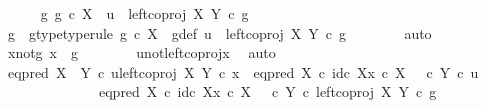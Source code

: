 \begin{isabellebody}
\ \ \ \ \isamarkupfalse%
\ {\isachardoublequoteopen}{\isasymexists}g{\isachardot}{\kern0pt}\ g\ {\isasymin}\isactrlsub c\ X\ {\isasymand}\ u\ {\isacharequal}{\kern0pt}\ left{\isacharunderscore}{\kern0pt}coproj\ X\ Y\ {\isasymcirc}\isactrlsub c\ g{\isachardoublequoteclose}\isanewline
\ \ \ \ \isamarkupfalse%
\ \isamarkupfalse%
\ g\ \ g{\isacharunderscore}{\kern0pt}type{\isacharbrackleft}{\kern0pt}type{\isacharunderscore}{\kern0pt}rule{\isacharbrackright}{\kern0pt}{\isacharcolon}{\kern0pt}\ {\isachardoublequoteopen}g\ {\isasymin}\isactrlsub c\ X{\isachardoublequoteclose}\ \ g{\isacharunderscore}{\kern0pt}def{\isacharcolon}{\kern0pt}\ {\isachardoublequoteopen}u\ {\isacharequal}{\kern0pt}\ left{\isacharunderscore}{\kern0pt}coproj\ X\ Y\ {\isasymcirc}\isactrlsub c\ g{\isachardoublequoteclose}\isanewline
\ \ \ \ \ \ \isamarkupfalse%
\ auto\isanewline
\ \ \ \ \isamarkupfalse%
\ \isamarkupfalse%
\ x{\isacharunderscore}{\kern0pt}not{\isacharunderscore}{\kern0pt}g{\isacharcolon}{\kern0pt}\ {\isachardoublequoteopen}x\ {\isasymnoteq}\ g{\isachardoublequoteclose}\isanewline
\ \ \ \ \ \ \isamarkupfalse%
\ u{\isacharunderscore}{\kern0pt}not{\isacharunderscore}{\kern0pt}left{\isacharunderscore}{\kern0pt}coproj{\isacharunderscore}{\kern0pt}x\ \isamarkupfalse%
\ auto\isanewline
\ \ \ \ \isamarkupfalse%
\ {\isachardoublequoteopen}eq{\isacharunderscore}{\kern0pt}pred\ {\isacharparenleft}{\kern0pt}X\ {\isasymCoprod}\ Y{\isacharparenright}{\kern0pt}\ {\isasymcirc}\isactrlsub c\ {\isasymlangle}u{\isacharcomma}{\kern0pt}left{\isacharunderscore}{\kern0pt}coproj\ X\ Y\ {\isasymcirc}\isactrlsub c\ x{\isasymrangle}\ {\isacharequal}{\kern0pt}\ {\isacharparenleft}{\kern0pt}eq{\isacharunderscore}{\kern0pt}pred\ X\ {\isasymcirc}\isactrlsub c\ {\isasymlangle}id\isactrlsub c\ X{\isacharcomma}{\kern0pt}x\ {\isasymcirc}\isactrlsub c\ {\isasymbeta}\isactrlbsub X\isactrlesub {\isasymrangle}{\isacharparenright}{\kern0pt}\ {\isasymamalg}\ {\isacharparenleft}{\kern0pt}{\isasymf}\ {\isasymcirc}\isactrlsub c\ {\isasymbeta}\isactrlbsub Y\isactrlesub {\isacharparenright}{\kern0pt}\ {\isasymcirc}\isactrlsub c\ u{\isachardoublequoteclose}\isanewline
\ \ \ \ \isamarkupfalse%
\ {\isacharminus}{\kern0pt}\isanewline
\ \ \ \ \ \ \isamarkupfalse%
\ {\isachardoublequoteopen}{\isacharparenleft}{\kern0pt}eq{\isacharunderscore}{\kern0pt}pred\ X\ {\isasymcirc}\isactrlsub c\ {\isasymlangle}id\isactrlsub c\ X{\isacharcomma}{\kern0pt}x\ {\isasymcirc}\isactrlsub c\ {\isasymbeta}\isactrlbsub X\isactrlesub {\isasymrangle}{\isacharparenright}{\kern0pt}\ {\isasymamalg}\ {\isacharparenleft}{\kern0pt}{\isasymf}\ {\isasymcirc}\isactrlsub c\ {\isasymbeta}\isactrlbsub Y\isactrlesub {\isacharparenright}{\kern0pt}\ {\isasymcirc}\isactrlsub c\ left{\isacharunderscore}{\kern0pt}coproj\ X\ Y\ {\isasymcirc}\isactrlsub c\ g\isanewline

\end{isabellebody}
